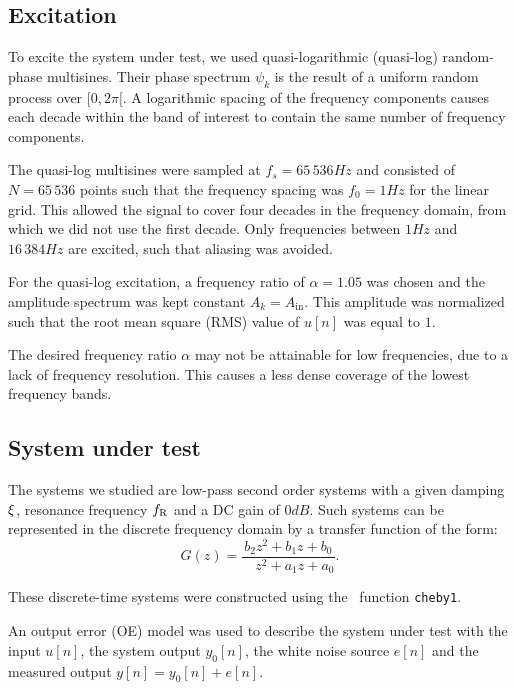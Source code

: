 \subsection{Excitation}
To excite the system under test, we used quasi-logarithmic (quasi-log) random-phase multisines. 
Their phase spectrum $\psi_{k}$ is the result of a uniform random process over $[0,2\pi[$.
A logarithmic spacing of the frequency components causes each decade within the band of interest to contain the same number of frequency components.

The quasi-log multisines were sampled at $f_s = 65\,536 \unit{Hz}$
and consisted of $N= 65\,536$ points such that the frequency spacing was $f_0 = 1\unit{Hz}$ for the linear grid.
This allowed the signal to cover four decades in the frequency domain,
from which we did not use the first decade.
Only frequencies between $1\unit{Hz}$ and $16\,384\unit{Hz}$ are excited, such that aliasing was avoided.

For the quasi-log excitation, a frequency ratio of $\alpha = 1.05$ was chosen
and the amplitude spectrum was kept constant $A_k = A_{\mathrm{in}}$. This
amplitude was normalized such that the root mean square (RMS) value of $u[n]$
was equal to $1$.

The desired frequency ratio $\alpha$ may not be attainable for low frequencies,  due to a lack of frequency resolution.
This causes a less dense coverage of the lowest frequency bands.

\subsection{System under test}
The systems we studied are low-pass second order systems with a given damping
$\xi$, resonance frequency $f_{\mathrm{R}}$ and a DC gain of $0 \unit{dB}$. Such systems
can be represented in the discrete frequency domain by a transfer
function of the form:
\begin{equation}
  G \left( z \right) = \frac{         b_2  z^{2} + b_1 z + b_0}%
                            {\phantom{a_2} z^{2} + a_1 z + a_0}
  \text{.}
  \label{eq:tf}
\end{equation}

These discrete-time systems were constructed using the \matlab\ function \texttt{cheby1}.

An output error (OE) model was used to describe the system under test with the
input $u[n]$, the system output $y_0[n]$, the white noise source $e[n]$
and the measured output $y[n] = y_0[n] + e[n]$.

